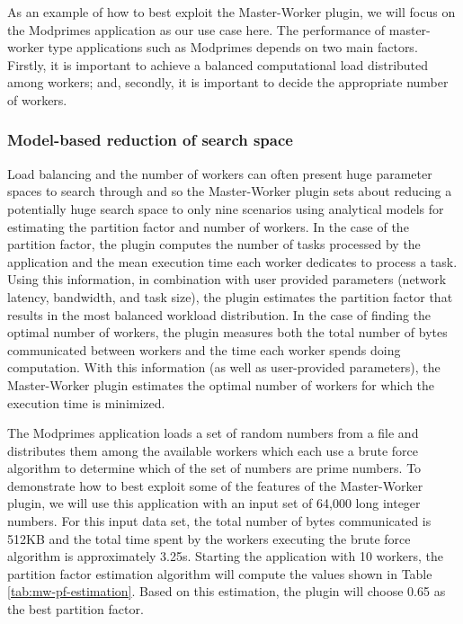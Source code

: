 
As an example of how to best exploit the Master-Worker plugin, we will focus on the Modprimes application as our use case here. The performance of master-worker type applications such as Modprimes depends on two main factors. Firstly, it is important to achieve a balanced computational load distributed among workers; and, secondly, it is important to decide the appropriate number of workers.

\subsubsection{Model-based reduction of search space}\label{para:mw-model}

Load balancing and the number of workers can often present huge parameter spaces to search through and so the Master-Worker plugin sets about reducing a potentially huge search space to only nine scenarios using analytical models for estimating the partition factor and number of workers. In the case of the partition factor, the plugin computes the number of tasks processed by the application and the mean execution time each worker dedicates to process a task. Using this information, in combination with user provided parameters (network latency, bandwidth, and task size), the plugin estimates the partition factor that results in the most balanced workload distribution. In the case of finding the optimal number of workers, the plugin measures both the total number of bytes communicated between workers and the time each worker spends doing computation. With this information (as well as user-provided parameters), the Master-Worker plugin estimates the optimal number of workers for which the execution time is minimized.

The Modprimes application loads a set of random numbers from a file and distributes them among the available workers which each use a brute force algorithm to determine which of the set of numbers are prime numbers. To demonstrate how to best exploit some of the features of the Master-Worker plugin, we will use this application with an input set of 64,000 long integer numbers. For this input data set, the total number of bytes communicated is 512KB and the total time spent by the workers executing the brute force algorithm is approximately 3.25s.  Starting the application with 10 workers, the partition factor estimation algorithm will compute the values shown in Table \ref{tab:mw-pf-estimation}. Based on this estimation, the plugin will choose 0.65 as the best partition factor.

